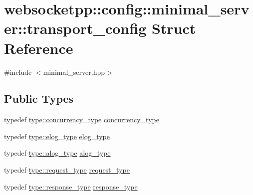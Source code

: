 \hypertarget{structwebsocketpp_1_1config_1_1minimal__server_1_1transport__config}{}\section{websocketpp\+:\+:config\+:\+:minimal\+\_\+server\+:\+:transport\+\_\+config Struct Reference}
\label{structwebsocketpp_1_1config_1_1minimal__server_1_1transport__config}


{\ttfamily \#include $<$minimal\+\_\+server.\+hpp$>$}

\subsection*{Public Types}
\begin{DoxyCompactItemize}
\item 
typedef \hyperlink{structwebsocketpp_1_1config_1_1minimal__server_a54e2bde35814bd82607f618aacd3ec88}{type\+::concurrency\+\_\+type} \hyperlink{structwebsocketpp_1_1config_1_1minimal__server_1_1transport__config_a753cbfdd821f9a6643ba8ee70d4834e6}{concurrency\+\_\+type}
\item 
typedef \hyperlink{structwebsocketpp_1_1config_1_1minimal__server_ab8a516661fb2ddd3a3c377823b623c1a}{type\+::elog\+\_\+type} \hyperlink{structwebsocketpp_1_1config_1_1minimal__server_1_1transport__config_a678324060123483e9513cbcd24829cba}{elog\+\_\+type}
\item 
typedef \hyperlink{structwebsocketpp_1_1config_1_1minimal__server_a9296068cfeabe4786e08691cd755f9b3}{type\+::alog\+\_\+type} \hyperlink{structwebsocketpp_1_1config_1_1minimal__server_1_1transport__config_a09acf498effc5c29b26e50a98ce2b8e9}{alog\+\_\+type}
\item 
typedef \hyperlink{structwebsocketpp_1_1config_1_1minimal__server_a7b07ee40c2b25c39fb8e333f969df8e3}{type\+::request\+\_\+type} \hyperlink{structwebsocketpp_1_1config_1_1minimal__server_1_1transport__config_ac45b02a9778ad3371ace822e80d43f8d}{request\+\_\+type}
\item 
typedef \hyperlink{structwebsocketpp_1_1config_1_1minimal__server_a19b0c06176d183a59e47bfe065b132ff}{type\+::response\+\_\+type} \hyperlink{structwebsocketpp_1_1config_1_1minimal__server_1_1transport__config_a5d29cd10696d9a67ad9baf580db6eddf}{response\+\_\+type}
\end{DoxyCompactItemize}
